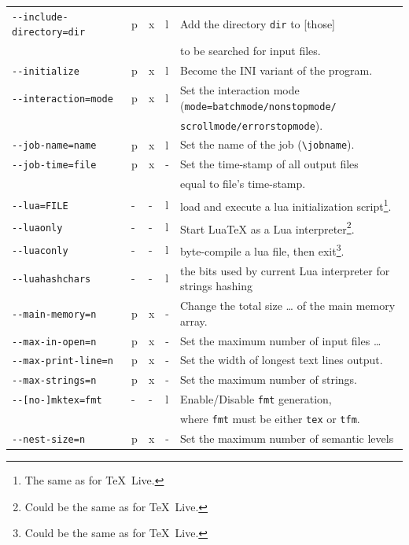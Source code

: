 \documentclass[a4paper]{article}%
\newcommand{\texlive}{\TeX~Live}
\begin{document}
{\begin{longtable}{lllll}
\texttt{-{}-include-directory=dir}    & p&x&l       & Add the directory \texttt{dir} to [those] \\
                                      &  & &        & to be searched for input files. \\
\texttt{-{}-initialize}               & p&x&l       & Become the INI variant of the program. \\
\texttt{-{}-interaction=mode}         & p&x&l       & Set the interaction mode (\texttt{mode=batchmode/nonstopmode/}\\
&& && \texttt{scrollmode/errorstopmode}). \\
\texttt{-{}-job-name=name}            & p&x&l       & Set the name of the job (\texttt{\textbackslash{}jobname}). \\
\texttt{-{}-job-time=file}            & p&x&- & Set the time-stamp of all output files \\
                                      &  & &        & equal to file's time-stamp. \\
\texttt{-{}-lua=FILE}                 & -&-&l & load and execute a lua initialization script\footnote%
   {The same as for \texlive. }.   \\
\texttt{-{}-luaonly}                  & -&-&l & Start LuaTeX as a Lua interpreter\footnote%
   {Could be the same as for \texlive. }.  \\
\texttt{-{}-luaconly}                 & -&-&l & byte-compile a lua file, then exit\footnote%
   {Could be the same as for \texlive. }. \\
\texttt{-{}-luahashchars}             & -&-&l & the bits used by current Lua interpreter for strings hashing \\
\texttt{-{}-main-memory=n}            & p&x&- & Change the total size \dots{} of the main memory array. \\
\texttt{-{}-max-in-open=n}            & p&x&- & Set the maximum number of input files \dots \\
\texttt{-{}-max-print-line=n}         & p&x&- & Set the width of longest text lines output. \\
\texttt{-{}-max-strings=n}            & p&x&- & Set the maximum number of strings. \\
\texttt{-{}-[no-]mktex=fmt}           & -&-&l & Enable/Disable \texttt{fmt} generation, \\
                                      &  & &  & where \texttt{fmt} must be either \texttt{tex} or \texttt{tfm}. \\
\texttt{-{}-nest-size=n}              & p&x&- & Set the maximum number of semantic levels \\

\end{longtable}}
\end{document}
